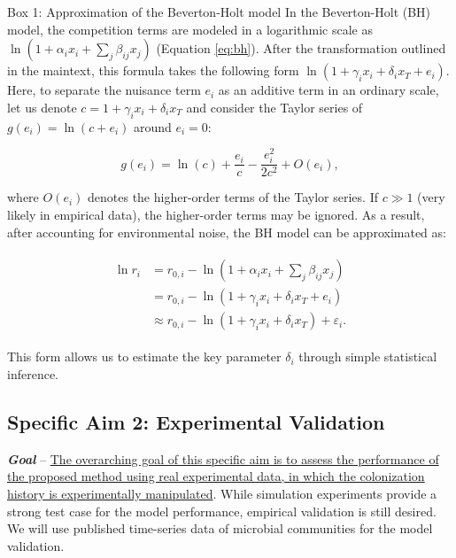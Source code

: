 \documentclass[12pt, class=article, crop=false]{standalone}
\begin{document}
\begin{tcolorbox}[{
  breakable,
  colback=white,
  colframe=gray,
  coltext=black,
  parbox=false,
  boxsep=5pt,
  arc=1pt}]
    Box 1: Approximation of the Beverton-Holt model
    \hline
    In the Beverton-Holt (BH) model, the competition terms are modeled in a logarithmic scale as $\ln(1 + \alpha_i x_i + \sum_j \beta_{ij} x_j)$ (Equation \ref{eq:bh}).
    After the transformation outlined in the maintext, this formula takes the following form $\ln(1 + \gamma_i x_i + \delta_i x_T + e_i)$.
    Here, to separate the nuisance term $e_i$ as an additive term in an ordinary scale, let us denote $c = 1 + \gamma_i x_i + \delta_i x_T$ and consider the Taylor series of $g(e_i) = \ln(c + e_i)$ around $e_i = 0$:

    \begin{equation}
        \label{eq:bhtaylor}
        g(e_i) = \ln(c) + \frac{e_i}{c} - \frac{e_i^2}{2 c^2} + O(e_i),
    \end{equation}

    where $O(e_i)$ denotes the higher-order terms of the Taylor series. If $c \gg 1$ (very likely in empirical data), the higher-order terms may be ignored.
    As a result, after accounting for environmental noise, the BH model can be approximated as:

    \begin{align}
    \begin{split}
        \ln r_i &= r_{0,i} - \ln(1 + \alpha_i x_i + \sum_j \beta_{ij} x_j)\\
                &= r_{0,i} - \ln(1 + \gamma_i x_i + \delta_{i} x_T + e_i)\\
                &\approx r_{0,i} - \ln(1 + \gamma_i x_i + \delta_i x_T) + \varepsilon_i.
    \end{split}
    \end{align}

    This form allows us to estimate the key parameter $\delta_i$ through simple statistical inference.
\end{tcolorbox}

\subsection*{Specific Aim 2: Experimental Validation}

\textbf{\textit{Goal}} -- 
\ul{The overarching goal of this specific aim is to assess the performance of the proposed method using real experimental data, in which the colonization history is experimentally manipulated}.
While simulation experiments provide a strong test case for the model performance, empirical validation is still desired.
We will use published time-series data of microbial communities for the model validation.
\end{document}
